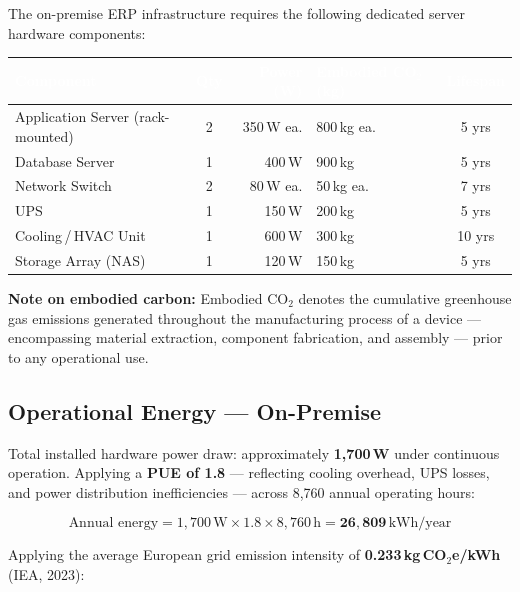 The on-premise ERP infrastructure requires the following dedicated server
hardware components:

\vspace{0.5em}
\begin{tabularx}{\textwidth}{l c r X c}
\toprule
\rowcolor{headerrow}
\textcolor{white}{\textbf{Component}} &
\textcolor{white}{\textbf{Qty}} &
\textcolor{white}{\textbf{Power (W)}} &
\textcolor{white}{\textbf{Embodied CO$_2$ (kg)}} &
\textcolor{white}{\textbf{Lifespan}} \\
\midrule
\rowcolor{rowalt}
  Application Server (rack-mounted) & 2 & 350\,W ea. & 800\,kg ea. & 5 yrs \\
  Database Server                   & 1 & 400\,W     & 900\,kg     & 5 yrs \\
\rowcolor{rowalt}
  Network Switch                    & 2 & 80\,W ea.  & 50\,kg ea.  & 7 yrs \\
  UPS                               & 1 & 150\,W     & 200\,kg     & 5 yrs \\
\rowcolor{rowalt}
  Cooling\,/\,HVAC Unit             & 1 & 600\,W     & 300\,kg     & 10 yrs \\
  Storage Array (NAS)               & 1 & 120\,W     & 150\,kg     & 5 yrs \\
\bottomrule
\end{tabularx}

\vspace{0.5em}
\textbf{Note on embodied carbon:} Embodied CO$_2$ denotes the cumulative
greenhouse gas emissions generated throughout the manufacturing process of
a device --- encompassing material extraction, component fabrication, and
assembly --- prior to any operational use.

\subsection{Operational Energy --- On-Premise}

Total installed hardware power draw: approximately \textbf{1{,}700\,W}
under continuous operation. Applying a \textbf{PUE of 1.8} --- reflecting
cooling overhead, UPS losses, and power distribution inefficiencies ---
across 8{,}760 annual operating hours:

\[
\text{Annual energy}
  = 1{,}700\,\mathrm{W} \times 1.8 \times 8{,}760\,\mathrm{h}
  = \mathbf{26{,}809\,\mathrm{kWh/year}}
\]

Applying the average European grid emission intensity of
\textbf{0.233\,kg\,CO$_2$e/kWh} (IEA, 2023):

